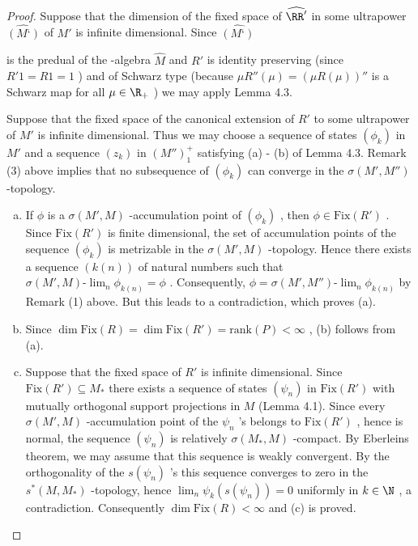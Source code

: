 \begin{proof}
Suppose that the dimension of the fixed space of $ \widehat{\RR'} $  in some ultrapower $ \widehat{(M‘)} $  of $ M' $  is infinite dimensional.
Since $ \widehat{(M‘)} $ 

\newpage

is the predual of the \WA-algebra $ \widehat{M} $  and $ R' $  is identity preserving (since $ R'1 = R1 = 1 $ ) and of Schwarz type (because $ \mu R''(\mu) = (\mu R(\mu))'' $  is a Schwarz map for all $ \mu \in \R_{+} $ ) we may apply Lemma 4.3.

Suppose that the fixed space of the canonical extension of $ R' $  to some ultrapower of $ M' $  is infinite dimensional.
Thus we may choose a sequence of states $ (\phi_{k}) $  in $ M' $  and a sequence $ (z_{k}) $  in $ (M'')_{1}^{+} $  satisfying (a) - (b) of Lemma 4.3.
Remark (3) above implies that no subsequence of $ (\phi_{k}) $  can converge in the $ \sigma(M',M'') $ -topology.

\begin{enumerate}[(a), wide]
\item
If $ \phi $  is a $ \sigma(M',M) $ -accumulation point of $ (\phi_{k}) $ , then $ \phi \in \text{Fix}(R') $ .
Since $ \text{Fix}(R') $  is finite dimensional, the set of accumulation points of the sequence $ (\phi_{k}) $  is metrizable in the $ \sigma(M',M) $ -topology.
Hence there exists a sequence $ (k(n)) $  of natural numbers such that $ \sigma(M',M)\text{-}\lim_{n} \phi_{k(n)} = \phi $ .
Consequently, $ \phi = \sigma(M',M'')\text{-}\lim_{n} \phi_{k(n)} $  by Remark (1) above.
But this leads to a contradiction, which proves (a).

\item
Since $ \dim \text{Fix}(R) = \dim \text{Fix}(R') = \text{rank}(P) < \infty $ , (b) follows from (a).

\item
Suppose that the fixed space of $ R' $  is infinite dimensional.
Since $ \text{Fix}(R') \subseteq M_{*} $  there exists a sequence of states $ (\psi_{n}) $  in $ \text{Fix}(R') $  with mutually orthogonal support projections in $ M $  (Lemma 4.1).
Since every $ \sigma(M',M) $ -accumulation point of the $ \psi_{n} $ 's belongs to $ \text{Fix}(R') $ , hence is normal, the sequence $ (\psi_{n}) $  is relatively $ \sigma(M_{*},M) $ -compact.
By Eberleins theorem, we may assume that this sequence is weakly convergent.
By the orthogonality of the $ s(\psi_{n}) $ 's this sequence converges to zero in the $ s^{*}(M,M_{*}) $ -topology, hence $ \lim_{n} \psi_{k}(s(\psi_{n})) = 0 $  uniformly in $ k \in \N $ , a contradiction.
Consequently $ \dim \text{Fix}(R) < \infty $  and (c) is proved.


\end{enumerate}
\end{proof}
